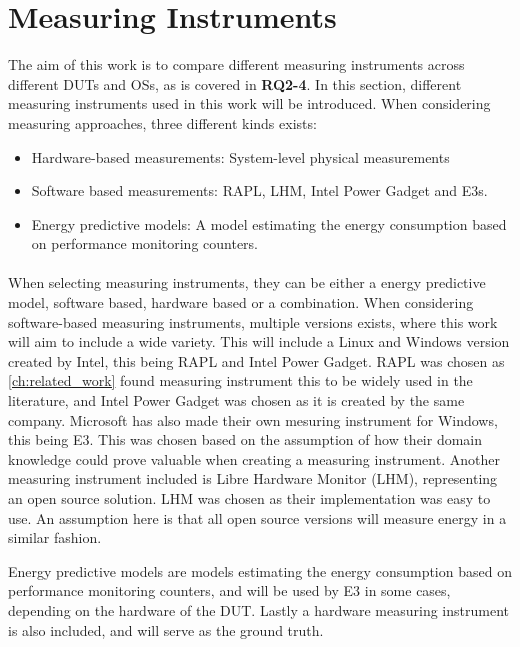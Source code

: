 \section{Measuring Instruments}\label{sec:measuring_instruments}

The aim of this work is to compare different measuring instruments across different DUTs and OSs, as is covered in \textbf{RQ2-4}. In this section, different measuring instruments used in this work will be introduced. When considering measuring approaches, three different kinds exists:

\begin{itemize}
    \item Hardware-based measurements: System-level physical measurements
    \item Software based measurements: RAPL, LHM, Intel Power Gadget and E3s.
    \item Energy predictive models: A model estimating the energy consumption based on performance monitoring counters.
\end{itemize}

\paragraph*{}
When selecting measuring instruments, they can be either a energy predictive model, software based, hardware based or a combination. When considering software-based measuring instruments, multiple versions exists, where this work will aim to include a wide variety. This will include a Linux and Windows version created by Intel, this being RAPL and Intel Power Gadget. RAPL was chosen as \cref{ch:related_work} found measuring instrument this to be widely used in the literature, and Intel Power Gadget was chosen as it is created by the same company. Microsoft has also made their own mesuring instrument for Windows, this being E3. This was chosen based on the assumption of how their domain knowledge could prove valuable when creating a measuring instrument. Another measuring instrument included is Libre Hardware Monitor (LHM), representing an open source solution. LHM was chosen as their implementation was easy to use. An assumption here is that all open source versions will measure energy in a similar fashion.\newline

Energy predictive models are models estimating the energy consumption based on performance monitoring counters, and will be used by E3 in some cases, depending on the hardware of the DUT. Lastly a hardware measuring instrument is also included, and will serve as the ground truth.



